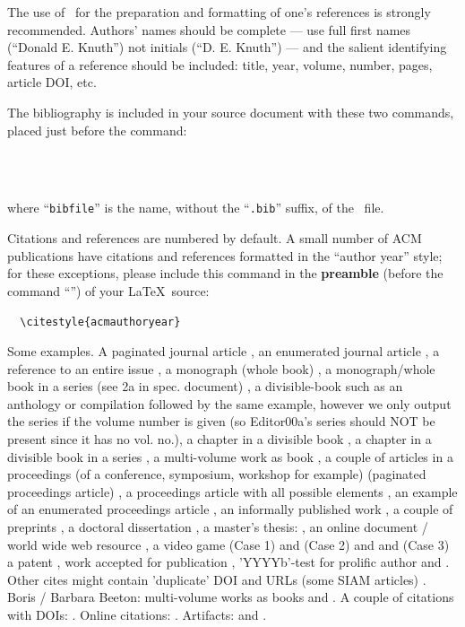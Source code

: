 The use of \BibTeX\ for the preparation and formatting of one's
references is strongly recommended. Authors' names should be complete
--- use full first names (``Donald E. Knuth'') not initials
(``D. E. Knuth'') --- and the salient identifying features of a
reference should be included: title, year, volume, number, pages,
article DOI, etc.

The bibliography is included in your source document with these two
commands, placed just before the \verb|| command:
\begin{verbatim}
  
  
\end{verbatim}
where ``\verb|bibfile|'' is the name, without the ``\verb|.bib|''
suffix, of the \BibTeX\ file.

Citations and references are numbered by default. A small number of
ACM publications have citations and references formatted in the
``author year'' style; for these exceptions, please include this
command in the {\bfseries preamble} (before the command
``\verb||'') of your \LaTeX\ source:
\begin{verbatim}
  \citestyle{acmauthoryear}
\end{verbatim}

Some examples.  A paginated journal article \cite{Abril07}, an
enumerated journal article \cite{Cohen07}, a reference to an entire
issue \cite{JCohen96}, a monograph (whole book) \cite{Kosiur01}, a
monograph/whole book in a series (see 2a in spec. document)
\cite{Harel79}, a divisible-book such as an anthology or compilation
\cite{Editor00} followed by the same example, however we only output
the series if the volume number is given \cite{Editor00a} (so
Editor00a's series should NOT be present since it has no vol. no.),
a chapter in a divisible book \cite{Spector90}, a chapter in a
divisible book in a series \cite{Douglass98}, a multi-volume work as
book \cite{Knuth97}, a couple of articles in a proceedings (of a
conference, symposium, workshop for example) (paginated proceedings
article) \cite{Andler79, Hagerup1993}, a proceedings article with
all possible elements \cite{Smith10}, an example of an enumerated
proceedings article \cite{VanGundy07}, an informally published work
\cite{Harel78}, a couple of preprints \cite{Bornmann2019,
	AnzarootPBM14}, a doctoral dissertation \cite{Clarkson85}, a
master's thesis: \cite{anisi03}, an online document / world wide web
resource \cite{Thornburg01, Ablamowicz07, Poker06}, a video game
(Case 1) \cite{Obama08} and (Case 2) \cite{Novak03} and \cite{Lee05}
and (Case 3) a patent \cite{JoeScientist001}, work accepted for
publication \cite{rous08}, 'YYYYb'-test for prolific author
\cite{SaeediMEJ10} and \cite{SaeediJETC10}. Other cites might
contain 'duplicate' DOI and URLs (some SIAM articles)
\cite{Kirschmer:2010:AEI:1958016.1958018}. Boris / Barbara Beeton:
multi-volume works as books \cite{MR781536} and \cite{MR781537}. A
couple of citations with DOIs:
\cite{2004:ITE:1009386.1010128,Kirschmer:2010:AEI:1958016.1958018}. Online
citations: \cite{TUGInstmem, Thornburg01, CTANacmart}. Artifacts:
\cite{R} and \cite{UMassCitations}.

